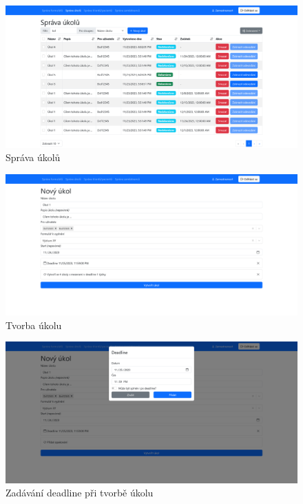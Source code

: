 \begin{figure}[H]
    \includegraphics[width=\textwidth]{../img/screenshots/sprava-ukolu}
    \caption{Správa úkolů}\label{fig:sprava-ukolu-screenshot}
\end{figure}

\begin{figure}[H]
    \includegraphics[width=\textwidth]{../img/screenshots/tvorba-ukolu}
    \caption{Tvorba úkolu}\label{fig:tvorba-ukolu-screenshot}
\end{figure}

\begin{figure}[H]
    \includegraphics[width=\textwidth]{../img/screenshots/tvorba-ukolu-deadline}
    \caption{Zadávání deadline při tvorbě úkolu}\label{fig:tvorba-ukolu-deadline-screenshot}
\end{figure}

